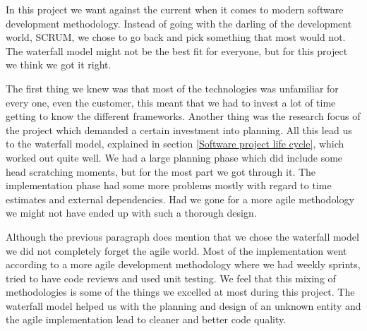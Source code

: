 In this project we want against the current when it comes to modern software development methodology. Instead of going with the darling of the development world, SCRUM, we chose to go back and pick something that most would not. The waterfall model might not be the best fit for everyone, but for this project we think we got it right.

The first thing we knew was that most of the technologies was unfamiliar for every one, even the customer, this meant that we had to invest a lot of time getting to know the different frameworks. Another thing was the research focus of the project which demanded a certain investment into planning. All this lead us to the waterfall model, explained in section \ref{Software project life cycle}, which worked out quite well. We had a large planning phase which did include some head scratching moments, but for the most part we got through it. The implementation phase had some more problems mostly with regard to time estimates and external dependencies. Had we gone for a more agile methodology we might not have ended up with such a thorough design.

Although the previous paragraph does mention that we chose the waterfall model we did not completely forget the agile world. Most of the implementation went according to a more agile development methodology where we had weekly sprints, tried to have code reviews and used unit testing. We feel that this mixing of methodologies is some of the things we excelled at most during this project. The waterfall model helped us with the planning and design of an unknown entity and the agile implementation lead to cleaner and better code quality.
